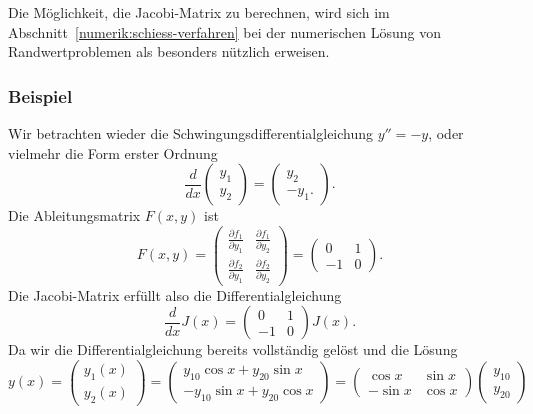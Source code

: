 Die Möglichkeit, die Jacobi-Matrix zu berechnen, wird sich im
Abschnitt~\ref{numerik:schiess-verfahren} bei der numerischen
Lösung von Randwertproblemen als besonders nützlich erweisen.

\subsubsection{Beispiel}
Wir betrachten wieder die Schwingungsdifferentialgleichung $y''=-y$,
%
oder vielmehr die Form erster Ordnung
\[
\frac{d}{dx}\begin{pmatrix}y_1\\y_2\end{pmatrix}
=
\begin{pmatrix}
y_2\\-y_1.
\end{pmatrix}.
\]
Die Ableitungsmatrix $F(x,y)$ ist
\[
F(x,y)
=
\begin{pmatrix}
\displaystyle\frac{\partial f_1}{\partial y_1}&\displaystyle\frac{\partial f_1}{\partial y_2}\\
\displaystyle\frac{\partial f_2}{\partial y_1}&\displaystyle\frac{\partial f_2}{\partial y_2}
\end{pmatrix}
=
\begin{pmatrix}
 0&1\\
-1&0
\end{pmatrix}.
\]
Die Jacobi-Matrix erfüllt also die Differentialgleichung
\[
\frac{d}{dx}J(x)=\begin{pmatrix}0&1\\-1&0\end{pmatrix}J(x).
\]
Da wir die Differentialgleichung bereits vollständig gelöst und
die Lösung
\begin{equation}
y(x)
=
\begin{pmatrix}
y_1(x)\\y_2(x)
\end{pmatrix}
=
\begin{pmatrix}
 y_{10}\cos x+y_{20}\sin x\\
-y_{10}\sin x+y_{20}\cos x
\end{pmatrix}
=
\begin{pmatrix}
 \cos x&\sin x\\
-\sin x&\cos x
\end{pmatrix}
\begin{pmatrix}y_{10}\\y_{20}\end{pmatrix}
\label{grundlagen:beispiel1}
\end{equation}
